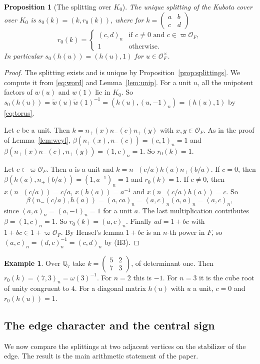 \documentclass[12pt,letterpaper]{article}
\numberwithin{equation}{section}
\newtheorem{proposition}[theorem]{Proposition}
\theoremstyle{definition}
\newtheorem{example}[theorem]{Example}
\theoremstyle{remark}
\newcommand{\OO}{\mathcal O_F}
\newcommand{\np}{n_{+}}
\newcommand{\nm}{n_{-}}
\newcommand{\sm}[4]{\left(\begin{smallmatrix}#1&#2\\#3&#4\end{smallmatrix}\right)}
\begin{document}
\begin{proposition}[The splitting over $K_0$]\label{prop:r0}
The unique splitting of the Kubota cover over $K_0$ is $s_0(k)=(k,r_0(k))$, where for $k=\sm abcd$
\begin{equation}\label{eq:r0}
 r_0(k)=
 \begin{cases}
 (c,d)_n & \text{if } c\ne0 \text{ and } c\in\varpi\OO,\\
 1&\text{otherwise}.
 \end{cases}
\end{equation}
In particular $s_0(h(u))=(h(u),1)$ for $u\in\OO^\times$.
\end{proposition}
\begin{proof}
The splitting exists and is unique by Proposition~\ref{prop:splittings}. We compute it from \eqref{eq:word} and Lemma~\ref{lem:unip}. For a unit $u$, all the unipotent factors of $w(u)$ and $w(1)$ lie in $K_0$. So $s_0(h(u))=\widetilde w(u)\widetilde w(1)^{-1}=(h(u),(u,-1)_n)=(h(u),1)$ by \eqref{eq:torus}.

Let $c$ be a unit. Then $k=\np(x)\nm(c)\np(y)$ with $x,y\in\OO$. As in the proof of Lemma~\ref{lem:weyl}, $\beta(\np(x),\nm(c))=(c,1)_n=1$ and $\beta(\np(x)\nm(c),\np(y))=(1,c)_n=1$. So $r_0(k)=1$.

Let $c\in\varpi\OO$. Then $a$ is a unit and $k=\nm(c/a)h(a)\np(b/a)$. If $c=0$, then $\beta(h(a),\np(b/a))=(1,a^{-1})_n=1$ and $r_0(k)=1$. If $c\ne0$, then $x(\nm(c/a))=c/a$, $x(h(a))=a^{-1}$ and $x(\nm(c/a)h(a))=c$. So
\[
 \beta(\nm(c/a),h(a))=(a,ca)_n=(a,c)_n(a,a)_n=(a,c)_n ,
\]
since $(a,a)_n=(a,-1)_n=1$ for a unit $a$. The last multiplication contributes $\beta=(1,c)_n=1$. So $r_0(k)=(a,c)_n$. Finally $ad=1+bc$ with $1+bc\in1+\varpi\OO$. By Hensel's lemma $1+bc$ is an $n$-th power in $F$, so $(a,c)_n=(d,c)_n^{-1}=(c,d)_n$ by (H3).
\end{proof}

\begin{example}
Over $\mathbb Q_7$ take $k=\sm5273$, of determinant one. Then $r_0(k)=(7,3)_n=\omega(3)^{-1}$. For $n=2$ this is $-1$. For $n=3$ it is the cube root of unity congruent to $4$. For a diagonal matrix $h(u)$ with $u$ a unit, $c=0$ and $r_0(h(u))=1$.
\end{example}

\subsection*{The edge character and the central sign}
We now compare the splittings at two adjacent vertices on the stabilizer of the edge. The result is the main arithmetic statement of the paper.
\end{document}
